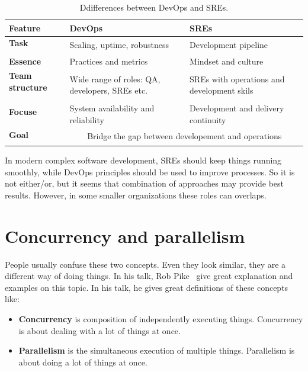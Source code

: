 {\begin{table}[H]
	\begin{center}
		\begin{tabular}{l|l|l}
			\textbf{Feature} & \textbf{DevOps} & \textbf{SREs}\\
			\hline
			\textbf{Task} & \multirow{2}{10em}{Scaling, uptime, robustness} & \multirow{2}{10em}{Development pipeline} \\
			& & \\
			\textbf{Essence} & Practices and metrics &  Mindset and culture \\
			\textbf{Team structure} & \multirow{3}{10em}{Wide range of roles: QA, developers, SREs etc.} &  \multirow{3}{10em}{SREs with operations and development skils} \\
			&  &  \\
			&  &  \\
			\textbf{Focuse} & \multirow{2}{10em}{System availability and reliability} & \multirow{2}{10em}{Development and delivery continuity} \\
			 &  &  \\
			 \hline
			\textbf{Goal} & \multicolumn{2}{c}{\multirow{2}{15em}{Bridge the gap between developement and operations}} \\
			&  &  \\
		\end{tabular}
	\end{center}
	\vspace{-0.5cm}
	\caption{Ddifferences between DevOps and SREs.}
	\label{tab:table10}
\end{table}

\noindent
In modern complex software development, SREs should keep things running smoothly, while DevOps principles should be used to improve processes. So it is not either/or, but it seems that combination of approaches may provide best results. However, in some smaller organizations these roles can overlaps.
}
%
%
\section{Concurrency and parallelism}\label{sec:concurency_parallelism}
%
People usually confuse these two concepts. Even they look similar, they are a different way of doing things. In his talk, Rob Pike~\cite{Pike} give great explanation and examples on this topic. In his talk, he gives great definitions of these concepts like:

\begin{itemize}
	\item \textbf{Concurrency} is composition of independently executing things. Concurrency is about dealing with a lot of things at once.
	\item \textbf{Parallelism} is the simultaneous execution of multiple things. Parallelism is about doing a lot of things at once. 
\end{itemize}


